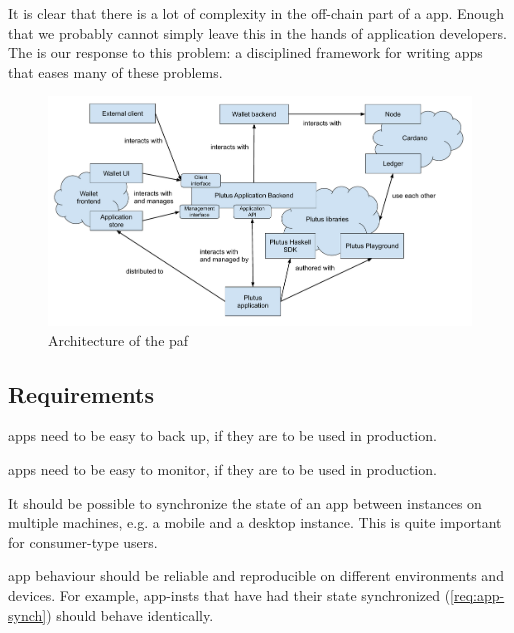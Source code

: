 \documentclass[plutus.tex]{subfiles}
\begin{document}
It is clear that there is a lot of complexity in the \gls{off-chain} part of a \gls{app}.
Enough that we probably cannot simply leave this in the hands of application developers.
The  is our response to this problem: a disciplined framework for writing \glspl{app} that eases many of these problems.

\begin{figure}[t]
  \centering
  \includegraphics[width=\textwidth]{paf-architecture.pdf}
  \caption{Architecture of the \gls{paf}}
  \label{fig:paf-architecture}
\end{figure}

\subsection{Requirements}
\begin{requirement}[Backups]
\label{req:app-backups}
\Glspl{app} need to be easy to back up, if they are to be used in production.
\end{requirement}

\begin{requirement}[Monitoring]
\label{req:app-monitoring}
\Glspl{app} need to be easy to monitor, if they are to be used in production.
\end{requirement}

\begin{requirement}[Synchronization]
\label{req:app-synch}
It should be possible to synchronize the state of an \gls{app} between instances on multiple machines, e.g. a mobile and a desktop instance.
This is quite important for consumer-type users.
\end{requirement}

\begin{requirement}[Reproducibility]
\label{req:app-reproducibility}
\Gls{app} behaviour should be reliable and reproducible on different environments and devices.
For example, \glspl{app-inst} that have had their state synchronized (\cref{req:app-synch}) should behave identically.
\end{requirement}
\end{document}
